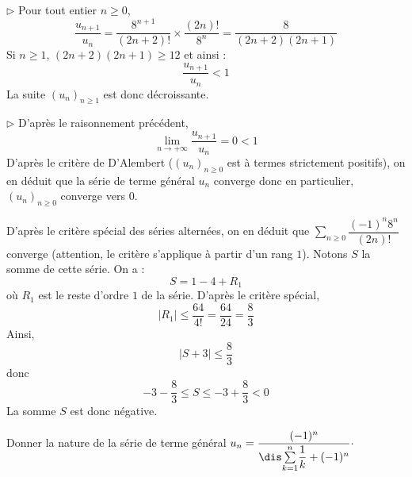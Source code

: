 \documentclass[a4paper,10pt]{report}
\newcommand{\Sum}[2]{\ensuremath{\textstyle{\sum\limits_{#1}^{#2}}}}
\begin{document}
\medskip

\noindent $\rhd$ Pour tout entier $n \geq 0$,
$$ \dfrac{u_{n+1}}{u_n} = \dfrac{8^{n+1}}{(2n+2)!} \times \dfrac{(2n)!}{8^n} =\dfrac{8}{(2n+2)(2n+1)}$$
Si $n \geq 1$, $(2n+2)(2n+1) \geq 12$ et ainsi :
$$  \dfrac{u_{n+1}}{u_n} < 1$$
La suite $(u_n)_{n \geq 1}$ est donc décroissante.

\medskip

\noindent $\rhd$ D'après le raisonnement précédent,
$$ \lim_{n \rightarrow + \infty}  \dfrac{u_{n+1}}{u_n} = 0 <1$$
D'après le critère de D'Alembert ($(u_n)_{n \geq 0}$ est à termes strictement positifs), on en déduit que la série de terme général $u_n$ converge donc en particulier, $(u_n)_{n \geq 0}$ converge vers $0$.

\medskip

\noindent D'après le critère spécial des séries alternées, on en déduit que $\Sum{n \geq 0}{} {\dfrac{( - 1)^n 8^n}{(2n)!}}$ converge (attention, le critère s'applique à partir d'un rang $1$). Notons $S$ la somme de cette série. On a :
$$ S= 1 - 4 + R_1$$
où $R_1$ est le reste d'ordre $1$ de la série. D'après le critère spécial, 
$$ \vert R_1 \vert \leq \dfrac{64}{4!} = \dfrac{64}{24} = \dfrac{8}{3}$$
Ainsi, 
$$ \vert S + 3 \vert \leq \dfrac{8}{3}$$
donc 
$$ -3- \dfrac{8}{3} \leq S \leq -3 + \dfrac{8}{3} <0$$
La somme $S$ est donc négative.

\medskip

\begin{Exa} Donner la nature de la série de terme général $u_n = \dfrac{(-1)^n}{\dis \Sum{k=1}{n} \dfrac{1}{k} + (-1)^n} \cdot$
\end{Exa}
\end{document}
